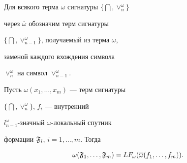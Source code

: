 




Для всякого терма $\omega$ сигнатуры $\{\bigcap,\vee_n^{\omega}\}$


через $\overline{\omega}$ обозначим терм сигнатуры


$\{\bigcap,\vee_{n-1}^{\omega}\}$, получаемый из терма $\omega$,


заменой каждого вхождения символа


$\vee_n^{\omega}$ на символ $\vee^{\omega}_{n-1}$.





\begin{lem}


Пусть $\omega (x_1,\dotsc,x_m)$ --- терм сигнатуры


$\{\bigcap,\vee_n^{\omega}\}$, $f_i$ --- внутренний


$l^{\omega}_{n-1}$-значный $\omega$-локальный спутник


формации $\frak{F}_i$, $i=1,\dotsc,m$. Тогда


$$


\omega (\frak{F}_1,\dotsc,\frak{F}_m)=


LF_{\omega}(\overline{\omega}(f_1,\dotsc,f_m)).


$$


\end{lem}





